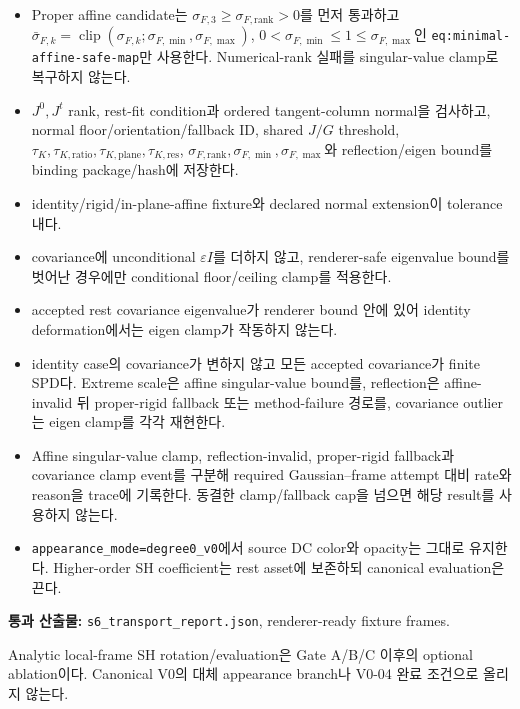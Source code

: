 \documentclass[10pt]{article}
\newcommand{\code}[1]{{\small\nolinkurl{#1}}}
\newcommand{\pass}[1]{\textcolor{GateGreen}{\textbf{#1}}}
\begin{document}
\begin{itemize}
  \item [\(\square\)] Proper affine candidate는
  \(\sigma_{F,3}\geq\sigma_{F,\mathrm{rank}}>0\)를 먼저 통과하고
  \(\bar\sigma_{F,k}=\operatorname{clip}(\sigma_{F,k};\sigma_{F,\min},\sigma_{F,\max})\),
  \(0<\sigma_{F,\min}\leq1\leq\sigma_{F,\max}\)인
  \code{eq:minimal-affine-safe-map}만 사용한다.
  Numerical-rank 실패를 singular-value clamp로 복구하지 않는다.
  \item [\(\square\)] \(J^0,J^t\) rank, rest-fit condition과 ordered tangent-column normal을 검사하고,
  normal floor/orientation/fallback ID, shared \(J/G\) threshold,
  \(\tau_K,\tau_{K,\mathrm{ratio}},\tau_{K,\mathrm{plane}},\tau_{K,\mathrm{res}}\),
  \(\sigma_{F,\mathrm{rank}},\sigma_{F,\min},\sigma_{F,\max}\)와
  reflection/eigen bound를 binding package/hash에 저장한다.
  \item [\(\square\)] identity/rigid/in-plane-affine fixture와 declared normal extension이 tolerance 내다.
  \item [\(\square\)] covariance에 unconditional \(\varepsilon I\)를 더하지 않고,
  renderer-safe eigenvalue bound를 벗어난 경우에만 conditional floor/ceiling clamp를 적용한다.
  \item [\(\square\)] accepted rest covariance eigenvalue가 renderer bound 안에 있어
  identity deformation에서는 eigen clamp가 작동하지 않는다.
  \item [\(\square\)] identity case의 covariance가 변하지 않고 모든 accepted covariance가 finite SPD다.
  Extreme scale은 affine singular-value bound를, reflection은 affine-invalid 뒤 proper-rigid
  fallback 또는 method-failure 경로를, covariance outlier는 eigen clamp를 각각 재현한다.
  \item [\(\square\)] Affine singular-value clamp, reflection-invalid, proper-rigid fallback과
  covariance clamp event를 구분해 required Gaussian--frame attempt 대비 rate와 reason을 trace에 기록한다.
  동결한 clamp/fallback cap을 넘으면 해당 result를 사용하지 않는다.
  \item [\(\square\)] \code{appearance\_mode=degree0\_v0}에서 source DC color와 opacity는
  그대로 유지한다. Higher-order SH coefficient는 rest asset에 보존하되 canonical evaluation은 끈다.
\end{itemize}

\pass{통과 산출물:} \code{s6\_transport\_report.json}, renderer-ready fixture frames.

Analytic local-frame SH rotation/evaluation은 Gate A/B/C 이후의 optional ablation이다.
Canonical V0의 대체 appearance branch나 V0-04 완료 조건으로 올리지 않는다.
\end{document}
